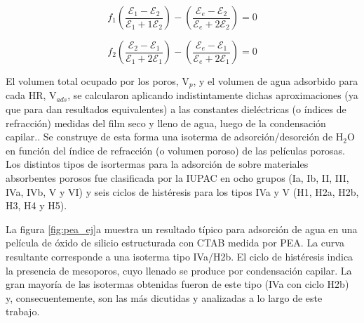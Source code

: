 							\begin{equation}
					 		   	 f_1\left(\frac{\mathcal{E}_1-\mathcal{E}_2}{\mathcal{E}_1+1\mathcal{E}_2}\right)-
					 		   	 \left(\frac{\mathcal{E}_e-\mathcal{E}_2}{\mathcal{E}_e+2\mathcal{E}_2}\right)=0
					 		     \label{eq:maxwall1}
								\end{equation}
						
								\begin{equation}
					 		   	 f_2\left(\frac{\mathcal{E}_2-\mathcal{E}_1}{\mathcal{E}_1+2\mathcal{E}_1}\right)-
					 		   	 \left(\frac{\mathcal{E}_e-\mathcal{E}_1}{\mathcal{E}_e+2\mathcal{E}_1}\right)=0
					 		     \label{eq:maxwall2}
								\end{equation}
		
		El volumen total ocupado por los poros, V$_p$, y el volumen de agua adsorbido para cada HR, V$_{ads}$, se calcularon aplicando indistintamente dichas aproximaciones (ya que para \pdm\space dan resultados equivalentes) a las constantes dieléctricas (o índices de refracción) medidas del film seco y lleno de agua, luego de la condensación capilar.\cite{Angelome2008,Fuertes2009,Nano-compuestas2013}. Se construye de esta forma una isoterma de adsorción/desorción de H$_2$O en función del índice de refracción (o volumen poroso) de las películas porosas. Los distintos tipos de isortermas para la adsorción de sobre materiales absorbentes porosos fue clasificada por la IUPAC en ocho grupos (Ia, Ib, II, III, IVa, IVb, V y VI) y seis ciclos de histéresis para los tipos IVa y V (H1, H2a, H2b, H3, H4 y H5). \cite{Thommes2015}

		La figura \ref{fig:pea_ej}a muestra un resultado típico para adsorción de agua en una película de óxido de silicio estructurada con CTAB medida por PEA. La curva resultante corresponde a una isoterma tipo IVa/H2b. El ciclo de histéresis indica la presencia de mesoporos, cuyo llenado se produce por condensación capilar. \cite{Gregg1967}La gran mayoría de las isotermas obtenidas fueron de este tipo (IVa con ciclo H2b) y, consecuentemente, son las más dicutidas y analizadas a lo largo de este trabajo. 


